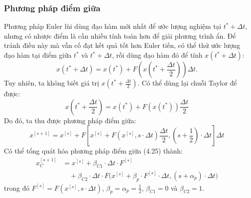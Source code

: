 \subsubsection{Phương pháp điểm giữa}
Phương pháp Euler lùi dùng đạo hàm mới nhất để ước lượng nghiệm tại $t^*+\Delta t$, nhưng có nhược điểm là cần nhiều tính toán hơn để giải phương trình ẩn. Để tránh điều này mà vẫn cố đạt kết quả tốt hơn Euler tiến, có thể thử ước lượng đạo hàm tại điểm giữa $t^*$ và $t^*+\Delta t$, rồi dùng đạo hàm đó để tính $x(t^*+\Delta t)$:
\[x(t^*+\Delta t)=x(t^*)+F\left(x\left(t^*+\frac{\Delta t}{2}\right)\right)\Delta t.\]
Tuy nhiên, ta không biết giá trị $x(t^*+\frac{\Delta t}{2})$. Có thể dùng lại chuỗi Taylor để được:
\[x\left(t^*+\frac{\Delta t}{2}\right)=x(t^*)+F(x(t^*))\frac{\Delta t}{2}\]
Do đó, ta thu được phương pháp điểm giữa:
\begin{equation}x^{[s+1]}=x^{[s]}+F\left[x^{[s]}+F(x^{[s]},s\cdot\Delta t)\frac{\Delta t}{2},\left(s+\frac12\right)\cdot\Delta t\right]\Delta t\tag{4.25}\end{equation}
Có thể tổng quát hóa phương pháp điểm giữa (4.25) thành:
\[\begin{aligned}
x_C^{[s+1]}&=x^{[s]}+\beta_{C1}\cdot\Delta t\cdot F^{[s]}\\
&\quad+\beta_{C2}\cdot\Delta t\cdot F\bigl(x^{[s]}+\beta_p\cdot F^{[s]}\cdot\Delta t,(s+\alpha_p)\cdot\Delta t\bigr)
\end{aligned}\]
trong đó $F^{[s]}=F(x^{[s]},s\cdot\Delta t)$, $\beta_p=\alpha_p=\frac12$, $\beta_{C1}=0$ và $\beta_{C2}=1$.

